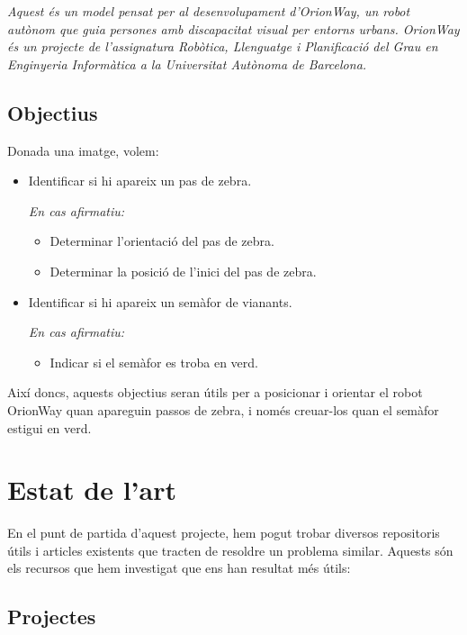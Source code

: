 \documentclass[10pt,a4paper,twocolumn,twoside]{article}
\begin{document}
\textit{Aquest és un model pensat per al desenvolupament d'OrionWay, un robot autònom que guia persones amb discapacitat visual per entorns urbans. OrionWay és un projecte de l'assignatura Robòtica, Llenguatge i Planificació del Grau en Enginyeria Informàtica a la Universitat Autònoma de Barcelona.}

\subsection{Objectius}
Donada una imatge, volem:
\vspace{-0.3em}
\begin{itemize}
	\item Identificar si hi apareix un pas de zebra.
	
	\vspace{0.3em}
	\textit{En cas afirmatiu:}
	\begin{itemize}[label=\textbullet]
		\item {Determinar l’orientació del pas de zebra.}
		\item {Determinar la posició de l'inici del pas de zebra.}
	\end{itemize}
	\item {Identificar si hi apareix un semàfor de vianants.}
	
	\vspace{0.3em}
	\textit{En cas afirmatiu:}
	\begin{itemize}[label=\textbullet]
		\item {Indicar si el semàfor es troba en verd.}
	\end{itemize}
\end{itemize}
Així doncs, aquests objectius seran útils per a posicionar i orientar el robot OrionWay quan apareguin passos de zebra, i només creuar-los quan el semàfor estigui en verd.

\section{Estat de l'art}

En el punt de partida d'aquest projecte, hem pogut trobar diversos repositoris útils i articles existents que tracten de resoldre un problema similar. Aquests són els recursos que hem investigat que ens han resultat més útils:

\subsection{Projectes}\label{sec:projectes}
\end{document}
